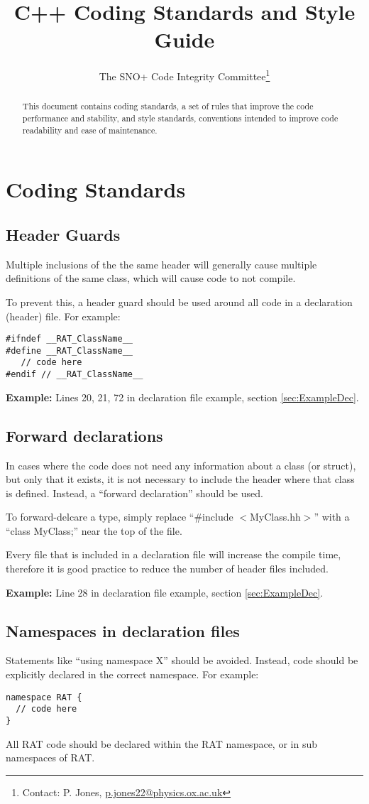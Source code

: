 \documentclass[11pt]{article}
\title{C++ Coding Standards and Style Guide}
\author{The SNO+ Code Integrity Committee\footnote{Contact: P. Jones, \href{p.jones22@physics.ox.ac.uk}{p.jones22@physics.ox.ac.uk}}}
\begin{document}
\maketitle
\begin{abstract}
This document contains coding standards, a set of rules that improve the code performance and stability, and style standards, conventions intended to improve code readability and ease of maintenance.
\end{abstract}

\tableofcontents
\section{Coding Standards}
\subsection{Header Guards}
Multiple inclusions of the the same header will generally cause multiple definitions of the same class, which will cause code to not compile.

To prevent this, a header guard should be used around all code in a declaration (header) file. For example:
\begin{verbatim}
#ifndef __RAT_ClassName__
#define __RAT_ClassName__
   // code here
#endif // __RAT_ClassName__
\end{verbatim}


{\bf Example:} Lines 20, 21, 72 in declaration file example, section \ref{sec:ExampleDec}.

\subsection{Forward declarations}
In cases where the code does not need any information about a class (or struct), but only that it exists, it is not necessary to include the header where that class is defined. Instead, a ``forward declaration'' should be used.

To forward-delcare a type, simply replace ``\#include $<$MyClass.hh$>$'' with a ``class MyClass;'' near the top of the file.

Every file that is included in a declaration file will increase the compile time, therefore it is good practice to reduce the number of header files included.

{\bf Example:} Line 28 in declaration file example, section \ref{sec:ExampleDec}.

\subsection{Namespaces in declaration files}
Statements like ``using namespace X'' should be avoided. Instead, code should be explicitly declared in the correct namespace. For example:
\begin{verbatim}
namespace RAT {
  // code here
}
\end{verbatim}
All RAT code should be declared within the RAT namespace, or in sub namespaces of RAT.
\end{document}
